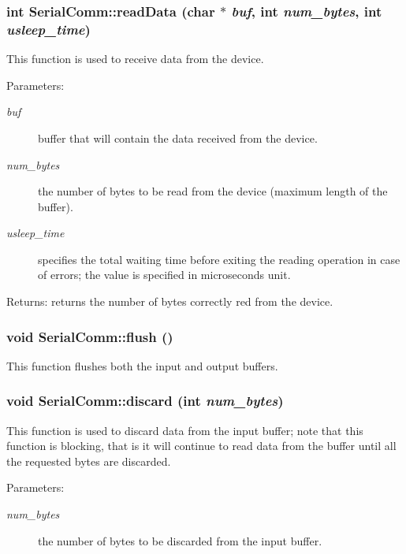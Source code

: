 \subsubsection[readData]{\setlength{\rightskip}{0pt plus 5cm}int SerialComm::readData (char $\ast$ {\em buf}, \/  int {\em num\_\-bytes}, \/  int {\em usleep\_\-time})}\label{class_serial_comm_a3b3d196cda66325cd97f6900e32dc74}


This function is used to receive data from the device. \begin{Desc}
\item[Parameters:]
\begin{description}
\item[{\em buf}]buffer that will contain the data received from the device. \item[{\em num\_\-bytes}]the number of bytes to be read from the device (maximum length of the buffer). \item[{\em usleep\_\-time}]specifies the total waiting time before exiting the reading operation in case of errors; the value is specified in microseconds unit. \end{description}
\end{Desc}
\begin{Desc}
\item[Returns:]returns the number of bytes correctly red from the device. \end{Desc}
\subsubsection[flush]{\setlength{\rightskip}{0pt plus 5cm}void SerialComm::flush ()}\label{class_serial_comm_49335bd844798ce814f8b10d14da4bdf}


This function flushes both the input and output buffers. 
\subsubsection[discard]{\setlength{\rightskip}{0pt plus 5cm}void SerialComm::discard (int {\em num\_\-bytes})}\label{class_serial_comm_f6d4ffe7bfc6e3c466946ae071ab94a8}


This function is used to discard data from the input buffer; note that this function is blocking, that is it will continue to read data from the buffer until all the requested bytes are discarded. \begin{Desc}
\item[Parameters:]
\begin{description}
\item[{\em num\_\-bytes}]the number of bytes to be discarded from the input buffer. \end{description}
\end{Desc}


